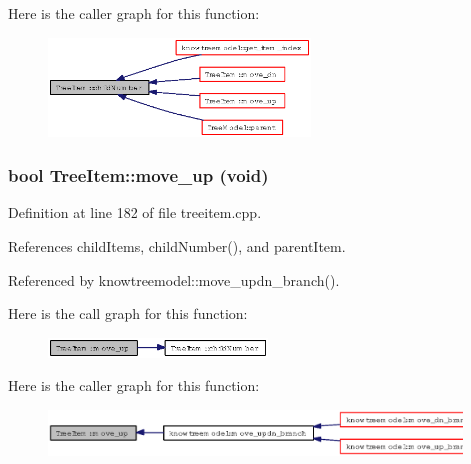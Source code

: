 Here is the caller graph for this function:\begin{figure}[H]
\begin{center}
\leavevmode
\includegraphics[width=197pt]{classTreeItem_87e01b18fd3b575ef1338545380228f5_icgraph}
\end{center}
\end{figure}
\subsubsection{\setlength{\rightskip}{0pt plus 5cm}bool Tree\-Item::move\_\-up (void)}\label{classTreeItem_207f6579c483068f8d2da4b1302705fc}




Definition at line 182 of file treeitem.cpp.

References child\-Items, child\-Number(), and parent\-Item.

Referenced by knowtreemodel::move\_\-updn\_\-branch().

Here is the call graph for this function:\begin{figure}[H]
\begin{center}
\leavevmode
\includegraphics[width=165pt]{classTreeItem_207f6579c483068f8d2da4b1302705fc_cgraph}
\end{center}
\end{figure}


Here is the caller graph for this function:\begin{figure}[H]
\begin{center}
\leavevmode
\includegraphics[width=311pt]{classTreeItem_207f6579c483068f8d2da4b1302705fc_icgraph}
\end{center}
\end{figure}
